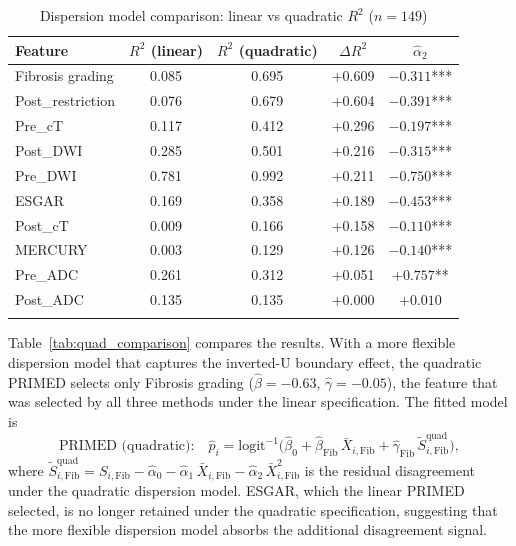 \documentclass[referee,lineno,pdflatex,sn-vancouver-num]{sn-jnl}
\begin{document}
\begin{table}[h]
\caption{Dispersion model comparison: linear vs quadratic $R^2$ ($n = 149$)}\label{tab:disp_r2}
\footnotesize
\renewcommand{\arraystretch}{1.05}
\begin{tabular*}{\textwidth}{@{\extracolsep\fill}lcccc}
\toprule
Feature & $R^2$ (linear) & $R^2$ (quadratic) & $\Delta R^2$ & $\hat\alpha_2$ \\
\midrule
Fibrosis grading   & 0.085 & 0.695 & +0.609 & $-0.311$*** \\
Post\_restriction   & 0.076 & 0.679 & +0.604 & $-0.391$*** \\
Pre\_cT             & 0.117 & 0.412 & +0.296 & $-0.197$*** \\
Post\_DWI           & 0.285 & 0.501 & +0.216 & $-0.315$*** \\
Pre\_DWI            & 0.781 & 0.992 & +0.211 & $-0.750$*** \\
ESGAR               & 0.169 & 0.358 & +0.189 & $-0.453$*** \\
Post\_cT            & 0.009 & 0.166 & +0.158 & $-0.110$*** \\
MERCURY             & 0.003 & 0.129 & +0.126 & $-0.140$*** \\
Pre\_ADC            & 0.261 & 0.312 & +0.051 & $+0.757$** \\
Post\_ADC           & 0.135 & 0.135 & +0.000 & $+0.010$ \\
\botrule
\end{tabular*}
\end{table}


Table~\ref{tab:quad_comparison} compares the results.
With a more flexible dispersion model that captures the inverted-U boundary effect, the quadratic PRIMED selects only Fibrosis grading ($\hat\beta = -0.63$, $\hat\gamma = -0.05$), the feature that was selected by all three methods under the linear specification.
The fitted model is
\[
  \text{PRIMED (quadratic):} \quad \hat p_i = \mathrm{logit}^{-1}\!\bigl(\hat\beta_0 + \hat\beta_{\mathrm{Fib}}\,\bar X_{i,\mathrm{Fib}} + \hat\gamma_{\mathrm{Fib}}\,\tilde S_{i,\mathrm{Fib}}^{\mathrm{quad}}\bigr),
\]
where $\tilde S_{i,\mathrm{Fib}}^{\mathrm{quad}} = S_{i,\mathrm{Fib}} - \hat\alpha_{0} - \hat\alpha_{1}\,\bar X_{i,\mathrm{Fib}} - \hat\alpha_{2}\,\bar X_{i,\mathrm{Fib}}^2$ is the residual disagreement under the quadratic dispersion model.
ESGAR, which the linear PRIMED selected, is no longer retained under the quadratic specification, suggesting that the more flexible dispersion model absorbs the additional disagreement signal.
\end{document}
